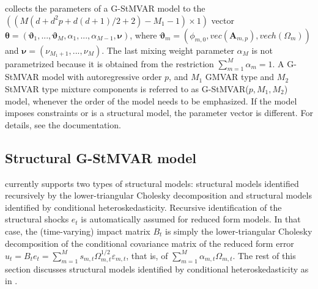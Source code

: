\documentclass[nojss]{jss}
\begin{document}
 collects the parameters of a G-StMVAR model to the $((M(d + d^2p + d(d+1)/2 + 2) - M_1 - 1)\times 1)$ vector $\boldsymbol{\theta}=(\boldsymbol{\vartheta}_1,...,\boldsymbol{\vartheta}_M,\alpha_1,...,\alpha_{M-1},\boldsymbol{\nu})$,  where $\boldsymbol{\vartheta}_m=(\phi_{m,0},vec(\boldsymbol{A}_{m,p}),vech(\Omega_m))$ and $\boldsymbol{\nu}=(\nu_{M_1+1},...,\nu_M)$.  The last mixing weight parameter $\alpha_M$ is not parametrized because it is obtained from the restriction $\sum_{m=1}^M \alpha_m = 1$.  A G-StMVAR model with autoregressive order $p$, and $M_1$ GMVAR type and $M_2$ StMVAR type mixture components is referred to as G-StMVAR($p,M_1,M_2$) model, whenever the order of the model needs to be emphasized. If the model imposes constraints or is a structural model, the parameter vector is different. For details, see the documentation.


\subsection{Structural G-StMVAR model}\label{sec:structural_model}
 currently supports two types of structural models: structural models identified recursively by the lower-triangular Cholesky decomposition and structural models identified by conditional heteroskedasticity. Recursive identification of the structural shocks $e_t$ is automatically assumed for reduced form models. In that case, the (time-varying) impact matrix $B_t$ is simply the lower-triangular Cholesky decomposition of the conditional covariance matrix of the reduced form error $u_t=B_te_t=\sum_{m=1}^Ms_{m,t}\Omega_{m,t}^{1/2}\varepsilon_{m,t}$, that is, of $\sum_{m=1}^M\alpha_{m,t}\Omega_{m,t}$. The rest of this section discusses structural models identified by conditional heteroskedasticity as in \cite{Virolainen2:2021}.
\end{document}
